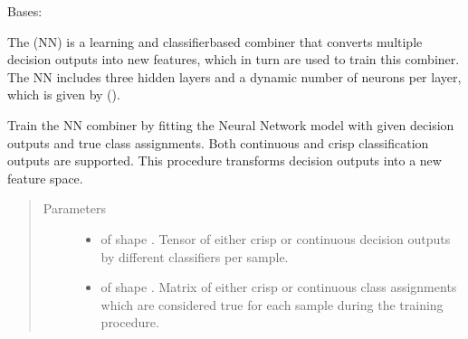 \documentclass[letterpaper,10pt,english]{sphinxmanual}
\begin{document}
\begin{fulllineitems}
\label{\detokenize{pusion.core.neural_network_combiner:pusion.core.neural_network_combiner.NeuralNetworkCombiner}}
\sphinxAtStartPar
Bases: {\hyperref[\detokenize{pusion.core.combiner:pusion.core.combiner.TrainableCombiner}]{}}

\sphinxAtStartPar
The {\hyperref[\detokenize{pusion.core.neural_network_combiner:pusion.core.neural_network_combiner.NeuralNetworkCombiner}]{}} (NN) is a learning and classifier\sphinxhyphen{}based combiner that converts multiple decision
outputs into new features, which in turn are used to train this combiner. The NN includes three hidden layers and a
dynamic number of neurons per layer, which is given by ().

\begin{fulllineitems}
\label{\detokenize{pusion.core.neural_network_combiner:pusion.core.neural_network_combiner.NeuralNetworkCombiner.train}}
\sphinxAtStartPar
Train the NN combiner by fitting the Neural Network model with given decision outputs and
true class assignments. Both continuous and crisp classification outputs are supported.
This procedure transforms decision outputs into a new feature space.
\begin{quote}\begin{description}
\item[{Parameters}] \leavevmode\begin{itemize}
\item {} 
\sphinxAtStartPar
{} \textendash{}  of shape .
Tensor of either crisp or continuous decision outputs by different classifiers per sample.

\item {} 
\sphinxAtStartPar
{} \textendash{}  of shape .
Matrix of either crisp or continuous class assignments which are considered true for each sample during
the training procedure.


\end{itemize}
\end{description}
\end{quote}
\end{fulllineitems}
\end{fulllineitems}
\end{document}
